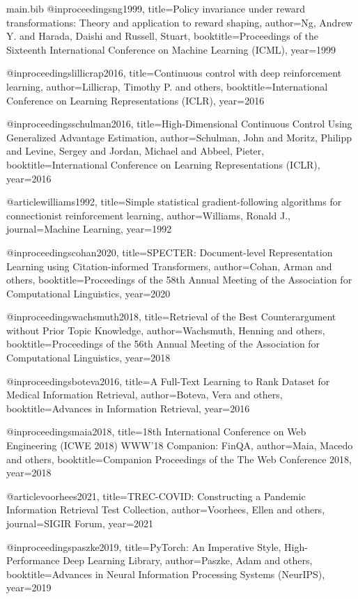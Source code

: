 \begin{filecontents*}{main.bib}
@inproceedings{ng1999,
  title={Policy invariance under reward transformations: Theory and application to reward shaping},
  author={Ng, Andrew Y. and Harada, Daishi and Russell, Stuart},
  booktitle={Proceedings of the Sixteenth International Conference on Machine Learning (ICML)},
  year={1999}
}

@inproceedings{lillicrap2016,
  title={Continuous control with deep reinforcement learning},
  author={Lillicrap, Timothy P. and others},
  booktitle={International Conference on Learning Representations (ICLR)},
  year={2016}
}

@inproceedings{schulman2016,
  title={High-Dimensional Continuous Control Using Generalized Advantage Estimation},
  author={Schulman, John and Moritz, Philipp and Levine, Sergey and Jordan, Michael and Abbeel, Pieter},
  booktitle={International Conference on Learning Representations (ICLR)},
  year={2016}
}

@article{williams1992,
  title={Simple statistical gradient-following algorithms for connectionist reinforcement learning},
  author={Williams, Ronald J.},
  journal={Machine Learning},
  year={1992}
}

@inproceedings{cohan2020,
  title={SPECTER: Document-level Representation Learning using Citation-informed Transformers},
  author={Cohan, Arman and others},
  booktitle={Proceedings of the 58th Annual Meeting of the Association for Computational Linguistics},
  year={2020}
}

@inproceedings{wachsmuth2018,
  title={Retrieval of the Best Counterargument without Prior Topic Knowledge},
  author={Wachsmuth, Henning and others},
  booktitle={Proceedings of the 56th Annual Meeting of the Association for Computational Linguistics},
  year={2018}
}

@inproceedings{boteva2016,
  title={A Full-Text Learning to Rank Dataset for Medical Information Retrieval},
  author={Boteva, Vera and others},
  booktitle={Advances in Information Retrieval},
  year={2016}
}

@inproceedings{maia2018,
  title={18th International Conference on Web Engineering (ICWE 2018) WWW'18 Companion: FinQA},
  author={Maia, Macedo and others},
  booktitle={Companion Proceedings of the The Web Conference 2018},
  year={2018}
}

@article{voorhees2021,
  title={TREC-COVID: Constructing a Pandemic Information Retrieval Test Collection},
  author={Voorhees, Ellen and others},
  journal={SIGIR Forum},
  year={2021}
}

@inproceedings{paszke2019,
  title={PyTorch: An Imperative Style, High-Performance Deep Learning Library},
  author={Paszke, Adam and others},
  booktitle={Advances in Neural Information Processing Systems (NeurIPS)},
  year={2019}
}


\end{filecontents*}
